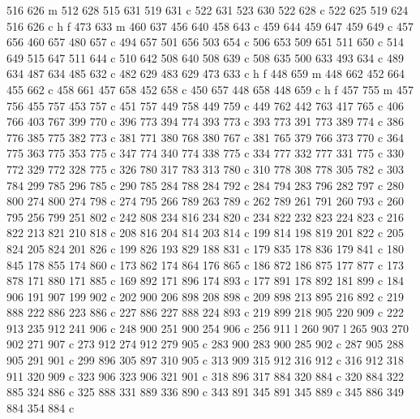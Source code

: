 {{        516 626 m
        512 628 515 631 519 631 c
        522 631 523 630 522 628 c
        522 625 519 624 516 626 c
        h f
        473 633 m
        460 637 456 640 458 643 c
        459 644 459 647 459 649 c
        457 656 460 657 480 657 c
        494 657 501 656 503 654 c
        506 653 509 651 511 650 c
        514 649 515 647 511 644 c
        510 642 508 640 508 639 c
        508 635 500 633 493 634 c
        489 634 487 634 485 632 c
        482 629 483 629 473 633 c
        h f
        448 659 m
        448 662 452 664 455 662 c
        458 661 457 658 452 658 c
        450 657 448 658 448 659 c
        h f
        457 755 m
        457 756 455 757 453 757 c
        451 757 449 758 449 759 c
        449 762 442 763 417 765 c
        406 766 403 767 399 770 c
        396 773 394 774 393 773 c
        393 773 391 773 389 774 c
        386 776 385 775 382 773 c
        381 771 380 768 380 767 c
        381 765 379 766 373 770 c
        364 775 363 775 353 775 c
        347 774 340 774 338 775 c
        334 777 332 777 331 775 c
        330 772 329 772 328 775 c
        326 780 317 783 313 780 c
        310 778 308 778 305 782 c
        303 784 299 785 296 785 c
        290 785 284 788 284 792 c
        284 794 283 796 282 797 c
        280 800 274 800 274 798 c
        274 795 266 789 263 789 c
        262 789 261 791 260 793 c
        260 795 256 799 251 802 c
        242 808 234 816 234 820 c
        234 822 232 823 224 823 c
        216 822 213 821 210 818 c
        208 816 204 814 203 814 c
        199 814 198 819 201 822 c
        205 824 205 824 201 826 c
        199 826 193 829 188 831 c
        179 835 178 836 179 841 c
        180 845 178 855 174 860 c
        173 862 174 864 176 865 c
        186 872 186 875 177 877 c
        173 878 171 880 171 885 c
        169 892 171 896 174 893 c
        177 891 178 892 181 899 c
        184 906 191 907 199 902 c
        202 900 206 898 208 898 c
        209 898 213 895 216 892 c
        219 888 222 886 223 886 c
        227 886 227 888 224 893 c
        219 899 218 905 220 909 c
        222 913 235 912 241 906 c
        248 900 251 900 254 906 c
        256 911 l
        260 907 l
        265 903 270 902 271 907 c
        273 912 274 912 279 905 c
        283 900 283 900 285 902 c
        287 905 288 905 291 901 c
        299 896 305 897 310 905 c
        313 909 315 912 316 912 c
        316 912 318 911 320 909 c
        323 906 323 906 321 901 c
        318 896 317 884 320 884 c
        320 884 322 885 324 886 c
        325 888 331 889 336 890 c
        343 891 345 891 345 889 c
        345 886 349 884 354 884 c
}}
